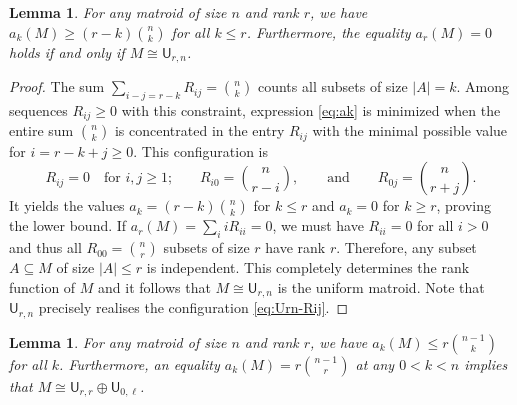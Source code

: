 \documentclass[pagesize,paper=A4,11pt,bibliography=totoc,oneside]{scrartcl}
\newtheorem{lemma}[thm]{Lemma}
\newcommand{\abs}[1]{\left|#1\right|}
\newcommand{\UM}[2]{\mathsf{U}_{#2,#1}} %
\begin{document}
\begin{lemma}\label{lem:ak-lower}
    For any matroid of size $n$ and rank $r$, we have $a_k(M)\geq (r-k)\binom{n}{k}$ for all $k\leq r$. Furthermore, the equality $a_r(M)=0$ holds if and only if $M\cong \UM{n}{r}$.
\end{lemma}
\begin{proof}
    The sum $\sum_{i-j=r-k} R_{ij}=\binom{n}{k}$ counts all subsets of size $\abs{A}=k$. Among sequences $R_{ij}\geq 0$ with this constraint, expression \eqref{eq:ak} is minimized when the entire sum $\binom{n}{k}$ is concentrated in the entry $R_{ij}$ with the minimal possible value for $i=r-k+j \geq 0$. This configuration is
    \begin{equation} \label{eq:Urn-Rij}
        R_{ij} = 0\quad\text{for $i,j\geq 1$;}\qquad
        R_{i0} = \binom{n}{r-i},\qquad\text{and}\qquad
        R_{0j} = \binom{n}{r+j}.        
    \end{equation}
    It yields the values $a_k=(r-k)\binom{n}{k}$ for $k\leq r$ and $a_k=0$ for $k\geq r$, proving the lower bound. If $a_r(M)=\sum_{i} i R_{ii}=0$, we must have $R_{ii}=0$ for all $i>0$ and thus all $R_{00}=\binom{n}{r}$ subsets of size $r$ have rank $r$. Therefore, any subset $A\subseteq M$ of size $\abs{A}\leq r$ is independent. This completely determines the rank function of $M$ and it follows that $M\cong\UM{n}{r}$ is the uniform matroid. Note that $\UM{n}{r}$ precisely realises the configuration \eqref{eq:Urn-Rij}.
\end{proof}
\begin{lemma}\label{lem:ak-upper}
    For any matroid of size $n$ and rank $r$, we have $a_k(M)\leq r\binom{n-1}{k}$ for all $k$. Furthermore, an equality $a_k(M)=r\binom{n-1}{r}$ at any $0<k<n$ implies that $M\cong \UM{r}{r}\oplus\UM{\ell}{0}$.
\end{lemma}
\end{document}
